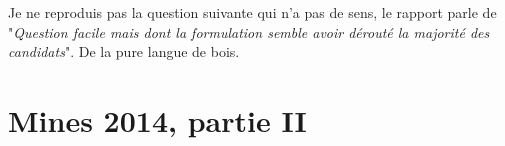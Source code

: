 \medskip

{\sf Je ne reproduis pas la question suivante qui n'a pas de sens, le rapport parle de "{\it Question facile mais dont la formulation semble avoir dérouté la majorité des candidats}". De la pure langue de bois.}


\newpage

\section{Mines 2014, partie II}
